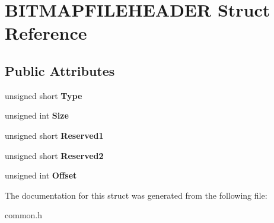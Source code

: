\hypertarget{struct_b_i_t_m_a_p_f_i_l_e_h_e_a_d_e_r}{}\section{B\+I\+T\+M\+A\+P\+F\+I\+L\+E\+H\+E\+A\+D\+E\+R Struct Reference}
\label{struct_b_i_t_m_a_p_f_i_l_e_h_e_a_d_e_r}
\subsection*{Public Attributes}
\begin{DoxyCompactItemize}
\item 
\hypertarget{struct_b_i_t_m_a_p_f_i_l_e_h_e_a_d_e_r_a036776bede3382e8b042dcd83b8af77c}{}unsigned short {\bfseries Type}\label{struct_b_i_t_m_a_p_f_i_l_e_h_e_a_d_e_r_a036776bede3382e8b042dcd83b8af77c}

\item 
\hypertarget{struct_b_i_t_m_a_p_f_i_l_e_h_e_a_d_e_r_a560acf79665f5ac6df8eb6295f68f0c3}{}unsigned int {\bfseries Size}\label{struct_b_i_t_m_a_p_f_i_l_e_h_e_a_d_e_r_a560acf79665f5ac6df8eb6295f68f0c3}

\item 
\hypertarget{struct_b_i_t_m_a_p_f_i_l_e_h_e_a_d_e_r_a22e48e4a16cbc532a5c370ea05783e59}{}unsigned short {\bfseries Reserved1}\label{struct_b_i_t_m_a_p_f_i_l_e_h_e_a_d_e_r_a22e48e4a16cbc532a5c370ea05783e59}

\item 
\hypertarget{struct_b_i_t_m_a_p_f_i_l_e_h_e_a_d_e_r_aeb7db116f3ed53eaeb7ec5c6382a6fa1}{}unsigned short {\bfseries Reserved2}\label{struct_b_i_t_m_a_p_f_i_l_e_h_e_a_d_e_r_aeb7db116f3ed53eaeb7ec5c6382a6fa1}

\item 
\hypertarget{struct_b_i_t_m_a_p_f_i_l_e_h_e_a_d_e_r_ae9467f947f30509333caa2e0ffa52056}{}unsigned int {\bfseries Offset}\label{struct_b_i_t_m_a_p_f_i_l_e_h_e_a_d_e_r_ae9467f947f30509333caa2e0ffa52056}

\end{DoxyCompactItemize}


The documentation for this struct was generated from the following file\+:\begin{DoxyCompactItemize}
\item 
common.\+h\end{DoxyCompactItemize}
